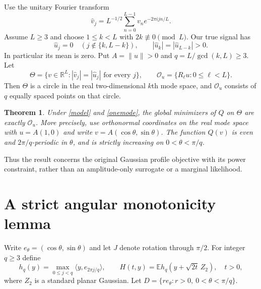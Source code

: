 \documentclass[11pt]{article}
\newtheorem{theorem}{Theorem}
\newcommand{\R}{\mathbb R}
\newcommand{\E}{\mathbb E}
\begin{document}
Use the unitary Fourier transform
\[
 \widehat v_j=L^{-1/2}\sum_{n=0}^{L-1}v_ne^{-2\pi i jn/L}.
\]
Assume $L\geq3$ and choose $1\leq k<L$ with $2k\not\equiv0\pmod L$.
Our true signal has
\begin{equation}\label{onemode}
 \widehat u_j=0\quad(j\notin\{k,L-k\}),\qquad
 |\widehat u_k|=|\widehat u_{L-k}|>0.
\end{equation}
In particular its mean is zero. Put $A=\|u\|>0$ and
$q=L/\gcd(k,L)\geq3$. Let
\[
 \Theta=\{v\in\R^L:|\widehat v_j|=|\widehat u_j|
                                  \text{ for every }j\},
 \qquad \mathcal O_u=\{R_\ell u:0\leq\ell<L\}.
\]
Then $\Theta$ is a circle in the real two-dimensional $k$th mode space,
and $\mathcal O_u$ consists of $q$ equally spaced points on that circle.

\begin{theorem}\label{population}
Under \eqref{model} and \eqref{onemode}, the global minimizers of $Q$
on $\Theta$ are exactly $\mathcal O_u$. More precisely, use orthonormal
coordinates on the real mode space with $u=A(1,0)$ and write
$v=A(\cos\theta,\sin\theta)$. The function $Q(v)$ is even and
$2\pi/q$-periodic in $\theta$, and is strictly increasing on
$0<\theta<\pi/q$.
\end{theorem}

Thus the result concerns the original Gaussian profile objective with
its power constraint, rather than an amplitude-only surrogate or a
marginal likelihood.

\section{A strict angular monotonicity lemma}
Write $e_\theta=(\cos\theta,\sin\theta)$ and let $J$ denote rotation
through $\pi/2$. For integer $q\geq3$ define
\begin{equation}\label{support}
 h_q(y)=\max_{0\leq j<q}\langle y,e_{2\pi j/q}\rangle,
 \qquad H(t,y)=\E h_q(y+\sqrt{2t}\,Z_2),\quad t>0,
\end{equation}
where $Z_2$ is a standard planar Gaussian. Let
$D=\{r e_\theta:r>0,\ 0<\theta<\pi/q\}$.
\end{document}
